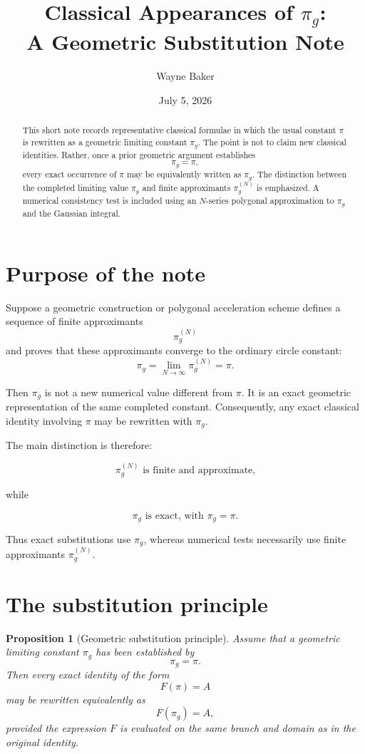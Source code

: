 \documentclass[11pt]{article}
\title{Classical Appearances of \texorpdfstring{\(\pi_g\)}{pi-g}:\\
A Geometric Substitution Note}
\author{Wayne Baker}
\date{July 5, 2026}
\newtheorem{proposition}{Proposition}
\begin{document}
\maketitle

\begin{abstract}
This short note records representative classical formulae in which the usual
constant \(\pi\) is rewritten as a geometric limiting constant \(\pi_g\). The
point is not to claim new classical identities. Rather, once a prior geometric
argument establishes
\[
\pi_g=\pi,
\]
every exact occurrence of \(\pi\) may be equivalently written as \(\pi_g\).
The distinction between the completed limiting value \(\pi_g\) and finite
approximants \(\pi_g^{(N)}\) is emphasized. A numerical consistency test is
included using an \(N\)-series polygonal approximation to \(\pi_g\) and the
Gaussian integral.
\end{abstract}

\section{Purpose of the note}

Suppose a geometric construction or polygonal acceleration scheme defines a
sequence of finite approximants
\[
\pi_g^{(N)}
\]
and proves that these approximants converge to the ordinary circle constant:
\[
\pi_g
=
\lim_{N\to\infty}\pi_g^{(N)}
=
\pi.
\]

Then \(\pi_g\) is not a new numerical value different from \(\pi\). It is an
exact geometric representation of the same completed constant. Consequently,
any exact classical identity involving \(\pi\) may be rewritten with
\(\pi_g\).

The main distinction is therefore:

\[
\pi_g^{(N)} \text{ is finite and approximate,}
\]

while

\[
\pi_g \text{ is exact, with } \pi_g=\pi.
\]

Thus exact substitutions use \(\pi_g\), whereas numerical tests necessarily use
finite approximants \(\pi_g^{(N)}\).

\section{The substitution principle}

\begin{proposition}[Geometric substitution principle]
Assume that a geometric limiting constant \(\pi_g\) has been established by
\[
\pi_g=\pi.
\]
Then every exact identity of the form
\[
F(\pi)=A
\]
may be rewritten equivalently as
\[
F(\pi_g)=A,
\]
provided the expression \(F\) is evaluated on the same branch and domain as in
the original identity.
\end{proposition}
\end{document}
